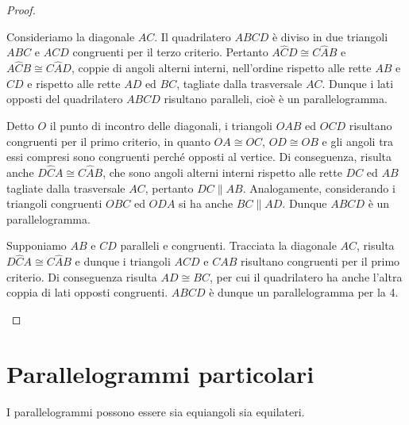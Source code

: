 \begin{proof}
\begin{enumerate*}
\item Consideriamo la diagonale $AC$. Il quadrilatero $ABCD$ è diviso in due triangoli $ABC$ e $ACD$ congruenti per il terzo criterio. Pertanto $A\widehat{C}D\cong C\widehat{A}B$ e $A\widehat{C}B\cong C\widehat{A}D$, coppie di angoli alterni interni, nell'ordine rispetto alle rette $AB$ e $CD$ e rispetto alle rette $AD$ ed $BC$, tagliate dalla trasversale $AC$. Dunque i lati opposti del quadrilatero $ABCD$ risultano paralleli, cioè è un parallelogramma.
\item Detto $O$ il punto di incontro delle diagonali, i triangoli $OAB$ ed $OCD$ risultano congruenti per il primo criterio, in quanto $OA\cong OC$, $OD\cong OB$ e gli angoli tra essi compresi sono congruenti perché opposti al vertice. Di conseguenza, risulta anche $D\widehat{C}A\cong C\widehat{A}B$, che sono angoli alterni interni rispetto alle rette $DC$ ed $AB$ tagliate dalla trasversale $AC$, pertanto $DC\parallel AB$. Analogamente, considerando i triangoli congruenti $OBC$ ed $ODA$ si ha anche $BC\parallel AD$. Dunque $ABCD$ è un parallelogramma.
\item Supponiamo $AB$ e $CD$ paralleli e congruenti. Tracciata la diagonale $AC$, risulta $D\widehat{C}A\cong C\widehat{A}B$ e dunque i triangoli $ACD$ e $CAB$ risultano congruenti per il primo criterio. Di conseguenza risulta $AD\cong BC$, per cui il quadrilatero ha anche l'altra coppia di lati opposti congruenti. $ABCD$ è dunque un parallelogramma per la 4.
\end{enumerate*}
\end{proof}

\section{Parallelogrammi particolari}

I parallelogrammi possono essere sia equiangoli sia equilateri.

